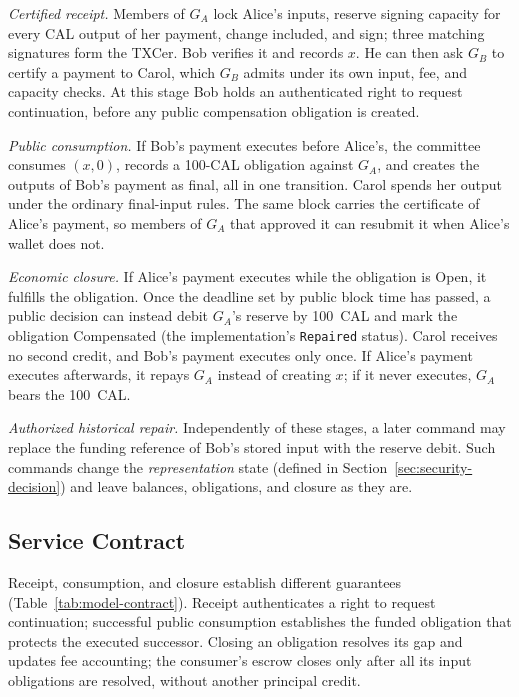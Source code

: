 \emph{Certified receipt.} Members of $G_A$ lock Alice's inputs, reserve
signing capacity for every CAL output of her payment, change included, and
sign; three matching signatures form the TXCer. Bob verifies it and records
$x$. He can then ask $G_B$ to certify a payment to Carol, which $G_B$
admits under its own input, fee, and capacity checks. At this stage Bob
holds an authenticated right to request continuation, before any public compensation obligation is created.

\emph{Public consumption.} If Bob's payment executes before Alice's, the
committee consumes $(x,0)$, records a 100-CAL obligation against $G_A$, and
creates the outputs of Bob's payment as final, all in one transition. Carol
spends her output under the ordinary final-input rules. The same block
carries the certificate of Alice's payment, so members of $G_A$ that
approved it can resubmit it when Alice's wallet does not.

\emph{Economic closure.} If Alice's payment executes while the obligation is
Open, it fulfills the obligation. Once the deadline set by public block time
has passed, a public decision can instead debit $G_A$'s reserve by 100~CAL
and mark the obligation Compensated (the implementation's \texttt{Repaired}
status). Carol receives no second credit, and Bob's payment executes only
once. If Alice's payment executes afterwards, it repays $G_A$ instead of
creating $x$; if it never executes, $G_A$ bears the 100~CAL.

\emph{Authorized historical repair.} Independently of these stages, a later
command may replace the funding reference of Bob's stored input with the
reserve debit. Such commands change the \emph{representation} state
(defined in Section~\ref{sec:security-decision}) and leave balances,
obligations, and closure as they are.
\subsection{Service Contract}
\label{sec:model-contract}
Receipt, consumption, and closure establish different guarantees
(Table~\ref{tab:model-contract}). Receipt authenticates a right to request
continuation; successful public consumption establishes the funded obligation
that protects the executed successor. Closing an obligation resolves its gap and updates fee accounting; the
consumer's escrow closes only after all its input obligations are resolved,
without another principal credit.

